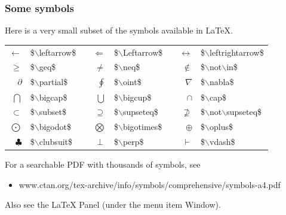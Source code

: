 \begin{frame} \frametitle{Some symbols}
Here is a very small subset of the symbols available in LaTeX.
\begin{tabular}{rl p{4mm} rl p{4mm} rl}
$\leftarrow$ & {\color{braces}\${\color{command}$\backslash$leftarrow}\$} &&
$\Leftarrow$ & {\color{braces}\${\color{command}$\backslash$Leftarrow}\$} && 
$\leftrightarrow$ & {\color{braces}\${\color{command}$\backslash$leftrightarrow}\$} \\
$\geq$ & {\color{braces}\${\color{command}$\backslash$geq}\$} &&
$\neq$ & {\color{braces}\${\color{command}$\backslash$neq}\$} &&
$\not\in$ & {\color{braces}\${\color{command}$\backslash$not$\backslash$in}\$} \\
$\partial$ & {\color{braces}\${\color{command}$\backslash$partial}\$} &&
$\oint$ & {\color{braces}\${\color{command}$\backslash$oint}\$} &&
$\nabla$ & {\color{braces}\${\color{command}$\backslash$nabla}\$} \\
$\bigcap$ & {\color{braces}\${\color{command}$\backslash$bigcap}\$} &&
$\bigcup$ & {\color{braces}\${\color{command}$\backslash$bigcup}\$} &&
$\cap$ & {\color{braces}\${\color{command}$\backslash$cap}\$} \\
$\subset$ & {\color{braces}\${\color{command}$\backslash$subset}\$} &&
$\supseteq$ & {\color{braces}\${\color{command}$\backslash$supseteq}\$} &&
$\not\supseteq$ & {\color{braces}\${\color{command}$\backslash$not$\backslash$supseteq}\$} \\
$\bigodot$ & {\color{braces}\${\color{command}$\backslash$bigodot}\$} &&
$\bigotimes$ & {\color{braces}\${\color{command}$\backslash$bigotimes}\$} &&
$\oplus$ & {\color{braces}\${\color{command}$\backslash$oplus}\$} \\
$\clubsuit$ & {\color{braces}\${\color{command}$\backslash$clubsuit}\$} &&
$\perp$ & {\color{braces}\${\color{command}$\backslash$perp}\$} &&
$\vdash$ & {\color{braces}\${\color{command}$\backslash$vdash}\$} \\
\end{tabular}
For a searchable PDF with thousands of symbols, see
\begin{itemize}
\item[] {\small\color{highlight}www.ctan.org/tex-archive/info/symbols/comprehensive/symbols-a4.pdf}
\end{itemize}
Also see the LaTeX Panel (under the menu item {\color{highlight}Window}).
\end{frame}

